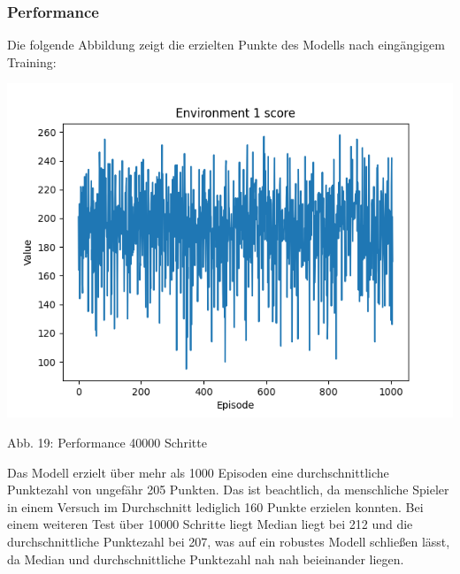 \subsubsection{Performance}
\begin{minipage}{\linewidth}
	Die folgende Abbildung zeigt die erzielten Punkte des Modells nach eingängigem Training:
	
	\vspace{0.5cm}
	\includegraphics[width=1\textwidth]{Bilder/maskableppo_ganzschoenclever_193avg_v3.1}
	
	Abb. 19: Performance 40000 Schritte\\
\end{minipage}

Das Modell erzielt über mehr als 1000 Episoden eine durchschnittliche Punktezahl von ungefähr 205 Punkten. Das ist beachtlich, da menschliche Spieler in einem Versuch im Durchschnitt lediglich 160 Punkte erzielen konnten. Bei einem weiteren Test über 10000 Schritte liegt Median liegt bei 212 und die durchschnittliche Punktezahl bei 207, was auf ein robustes Modell schließen lässt, da Median und durchschnittliche Punktezahl nah nah beieinander liegen.

